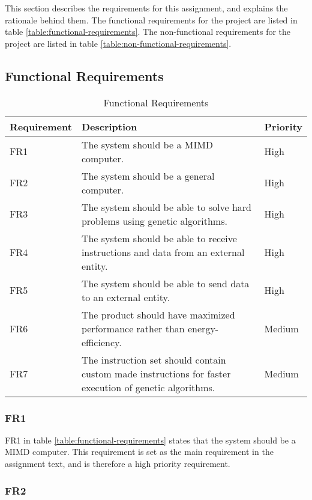This section describes the requirements for this assignment, and explains the rationale behind them.
The functional requirements for the project are listed in table \vref{table:functional-requirements}.
The non-functional requirements for the project are listed in table \vref{table:non-functional-requirements}.

 \subsection{Functional Requirements}

 \begin{table}[H]
 \begin{center}
 \begin{tabular}{| l | p{7cm} | l |}
 \hline
 Requirement & Description & Priority\\
 \hline
 FR1 & The system should be a MIMD computer. & High \\
 FR2 & The system should be a general computer. & High \\
 FR3 & The system should be able to solve hard problems using genetic algorithms. & High \\
 FR4 & The system should be able to receive instructions and data from an external entity. & High \\
 FR5 & The system should be able to send data to an external entity. & High \\
 FR6 & The product should have maximized performance rather than energy-efficiency. & Medium \\
 FR7 & The instruction set should contain custom made instructions for faster execution of genetic algorithms. & Medium \\
 \hline
 \end{tabular}
 \caption{Functional Requirements}
 \label{table:functional-requirements}
 \end{center}
 \end{table}

\subsubsection{FR1}

FR1 in table \vref{table:functional-requirements} states that the system should be a MIMD computer.
This requirement is set as the main requirement in the assignment text, and is therefore a high priority requirement.

\subsubsection{FR2}

